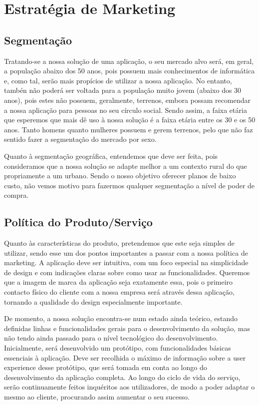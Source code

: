 \documentclass[11pt]{article}
\begin{document}
	\pagebreak
	
	\large
	\section{Estratégia de Marketing}
	\subsection{Segmentação}
	
	\normalsize
	
	Tratando-se a nossa solução de uma aplicação, o seu mercado alvo será, em geral, a população abaixo dos 50 anos, pois possuem mais conhecimentos de informática e, como tal, serão mais propícios de utilizar a nossa aplicação. No entanto, tambén não poderá ser voltada para a população muito jovem (abaixo dos 30 anos), pois estes não possuem, geralmente, terrenos, embora possam recomendar a nossa aplicação para pessoas no seu círculo social. Sendo assim, a faixa etária que esperemos que mais dê uso à nossa solução é a faixa etária entre os 30 e os 50 anos. Tanto homens quanto mulheres possuem e gerem terrenos, pelo que não faz sentido fazer a segmentação do mercado por sexo.
	
	Quanto à segmentação geográfica, entendemos que deve ser feita, pois consideramos que a nossa solução se adapte melhor a um contexto rural do que propriamente a um urbano. Sendo o nosso objetivo oferecer planos de baixo custo, não vemos motivo para fazermos qualquer segmentação a nível de poder de compra.
	
	\large
	\subsection{Política do Produto/Serviço}
	
	\normalsize
	
	Quanto às características do produto, pretendemos que este seja simples de utilizar, sendo esse um dos pontos importantes a passar com a nossa política de marketing. A aplicação deve ser intuitiva, com um foco especial na simplicidade de design e com indicações claras sobre como usar as funcionalidades. Queremos que a imagem de marca da aplicação seja exatamente essa, pois o primeiro contacto físico do cliente com a nossa empresa será através dessa aplicação, tornando a qualidade do design especialmente importante.
	
	De momento, a nossa solução encontra-se num estado ainda teórico, estando definidas linhas e funcionalidades gerais para o desenvolvimento da solução, mas não tendo ainda passado para o nível tecnológico do desenvolvimento. Inicialmente, será desenvolvido um protótipo, com funcionalidades básicas essenciais à aplicação. Deve ser recolhida o máximo de informação sobre a user experience desse protótipo, que será tomada em conta ao longo do desenvolvimento da aplicação completa. Ao longo do ciclo de vida do serviço, serão continuamente feitos inquéritos aos utilizadores, de modo a poder adaptar o mesmo ao cliente, procurando assim aumentar o seu sucesso.
	
\end{document}
